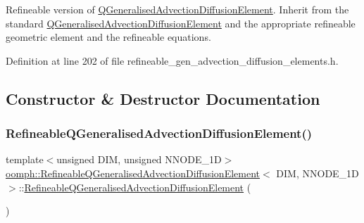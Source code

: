 Refineable version of \hyperlink{classoomph_1_1QGeneralisedAdvectionDiffusionElement}{Q\+Generalised\+Advection\+Diffusion\+Element}. Inherit from the standard \hyperlink{classoomph_1_1QGeneralisedAdvectionDiffusionElement}{Q\+Generalised\+Advection\+Diffusion\+Element} and the appropriate refineable geometric element and the refineable equations. 

Definition at line 202 of file refineable\+\_\+gen\+\_\+advection\+\_\+diffusion\+\_\+elements.\+h.



\subsection{Constructor \& Destructor Documentation}
\mbox{\label{classoomph_1_1RefineableQGeneralisedAdvectionDiffusionElement_aba8e7d52a832cefdbc121ddcb21e0856}} 
\subsubsection{\texorpdfstring{Refineable\+Q\+Generalised\+Advection\+Diffusion\+Element()}{RefineableQGeneralisedAdvectionDiffusionElement()}\hspace{0.1cm}{\footnotesize\ttfamily [1/2]}}
{\footnotesize\ttfamily template$<$unsigned D\+IM, unsigned N\+N\+O\+D\+E\+\_\+1D$>$ \\
\hyperlink{classoomph_1_1RefineableQGeneralisedAdvectionDiffusionElement}{oomph\+::\+Refineable\+Q\+Generalised\+Advection\+Diffusion\+Element}$<$ D\+IM, N\+N\+O\+D\+E\+\_\+1D $>$\+::\hyperlink{classoomph_1_1RefineableQGeneralisedAdvectionDiffusionElement}{Refineable\+Q\+Generalised\+Advection\+Diffusion\+Element} (\begin{DoxyParamCaption}{ }\end{DoxyParamCaption})\hspace{0.3cm}{\ttfamily [inline]}}



